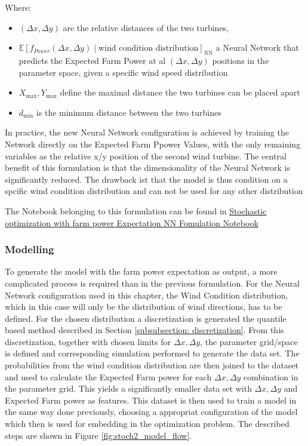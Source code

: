 \documentclass[preprint,12pt]{elsarticle}
\begin{document}
Where:
\begin{itemize}
	\item \( (\Delta x, \Delta y) \) are the relative distances of the two turbines,
	\item \( \mathbb{E}[f_{Power}(\Delta x, \Delta y) \mid \text{wind condition distribution}]_\text{NN}\) a Neural Network that predicts the Expected Farm Power at al \( (\Delta x, \Delta y) \) positions in the parameter space, given a specific wind speed distribution 
	\item \(  X_{\max}, Y_{\max} \) define the maximal distance the two turbines can be placed apart
	\item \( d_{\min} \) is the minimum distance between the two turbines
\end{itemize}

In practice, the new Neural Network configuration is achieved by training the Network directly on the Expected Farm Ppower Values, with the only remaining variables as the relative x/y position of the second wind turbine. The central benefit of this formulation is that the dimensionality of the Neural Network is significantly reduced. The drawback ist that the model is thus condition on a spcific wind condition distribution and can not be used for any other distribution


The Notebook belonging to this formulation can be found in \href{https://github.com/schmeti/uc3m_TFM_wind_farm_optimization_codebase/blob/main/Windfarm_power_modelling/0_two_turbine_problem_constrLearn_probweightedt_expNN.ipynb}{Stochastic optimization with farm power Expectation NN Fomulation Notebook} \cite{schmetz2025twoturbine_stoch2}

\subsubsection{Modelling}

To generate the model with the farm power expectation as output, a more complicated process is required than in the previous formulation. For the Neural Network configuration used in this chapter, the Wind Condition distribution, which in this case will only be the distribution of wind directions, has to be defined. For the chosen distribution a discretization is generated the quantile based method described in Section \ref{subsubsection: discretization}. From this discretization, together with chosen limits for \(\Delta x, \Delta y\), the parameter grid/space is defined and corresponding simulation performed to generate the data set. The probabilities from the wind condition distribution are then joined to the dataset and used to calculate the Expected Farm power for each \(\Delta x, \Delta y\) combination in the parameter grid. This yields a significantly smaller data set with \(\Delta x, \Delta y\) and Expected Farm power as features. This dataset is then used to train a model in the same way done previously, choosing a appropriat configuration of the model which then is used for embedding in the optimization problem. The described steps are shown in Figure \ref{fig:stoch2_model_flow}.
\end{document}
